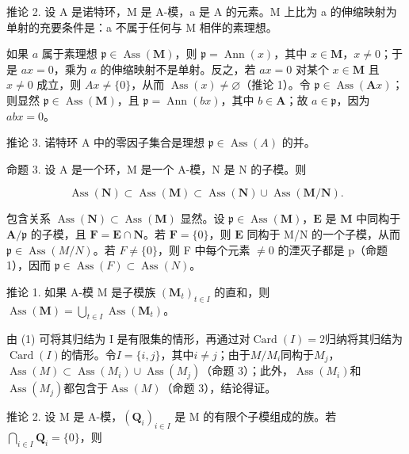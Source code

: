 推论 2. 设 A 是诺特环，M 是 A-模，a 是 A 的元素。M 上比为 a 的伸缩映射为单射的充要条件是：a 不属于任何与 M 相伴的素理想。

如果 \(a\) 属于素理想 \(\mathfrak{p} \in \operatorname{Ass}(\mathbf{M})\)，则 \(\mathfrak{p} = \operatorname{Ann}(x)\)，其中 \(x \in \mathbf{M}\)，\(x \neq 0\)；于是 \(ax = 0\)，乘为 \(a\) 的伸缩映射不是单射。反之，若 \(ax = 0\) 对某个 \(x \in \mathbf{M}\) 且 \(x \neq 0\) 成立，则 \(Ax \neq \{0\}\)，从而 \(\operatorname{Ass}(x) \neq \varnothing\)（推论 1）。令 \(\mathfrak{p} \in \operatorname{Ass}(\mathbf{A}x)\)；则显然 \(\mathfrak{p} \in \operatorname{Ass}(\mathbf{M})\)，且 \(\mathfrak{p} = \operatorname{Ann}(bx)\)，其中 \(b \in \mathbf{A}\)；故 \(a \in \mathfrak{p}\)，因为 \(abx = 0\)。

推论 3. 诺特环 A 中的零因子集合是理想 \(\mathfrak{p} \in \operatorname{Ass}(A)\) 的并。

命题 3. 设 A 是一个环，M 是一个 A-模，N 是 N 的子模。则

\[
\operatorname{Ass} (\mathbf {N}) \subset \operatorname{Ass} (\mathbf {M}) \subset \operatorname{Ass} (\mathbf {N}) \cup \operatorname{Ass} (\mathbf {M} / \mathbf {N}).\tag{2}
\]

包含关系 \(\operatorname{Ass}(\mathbf{N}) \subset \operatorname{Ass}(\mathbf{M})\) 显然。设 \(\mathfrak{p} \in \operatorname{Ass}(\mathbf{M})\)，\(\mathbf{E}\) 是 \(\mathbf{M}\) 中同构于 \(\mathbf{A} / \mathfrak{p}\) 的子模，且 \(\mathbf{F} = \mathbf{E} \cap \mathbf{N}\)。若 \(\mathbf{F} = \{0\}\)，则 \(\mathbf{E}\) 同构于 M/N 的一个子模，从而 \(\mathfrak{p} \in \operatorname{Ass}(M/N)\)。若 \(F \neq \{0\}\)，则 F 中每个元素 \(\neq 0\) 的湮灭子都是 p（命题 1），因而 \(\mathfrak{p} \in \operatorname{Ass}(F) \subset \operatorname{Ass}(N)\)。

推论 1. 如果 A-模 M 是子模族 \((\mathbf{M}_t)_{t \in I}\) 的直和，则 \(\operatorname{Ass}(\mathbf{M}) = \bigcup_{t \in I} \operatorname{Ass}(\mathbf{M}_t)\)。

由 (1) 可将其归结为 I 是有限集的情形，再通过对\(\operatorname{Card}(I) = 2\)归纳将其归结为\(\operatorname{Card}(I)\)的情形。令\(I = \{i, j\}\)，其中\(i \neq j\)；由于\(M/M_{i}\)同构于\(M_{j}\)，\(\operatorname{Ass}(M) \subset \operatorname{Ass}(M_{i}) \cup \operatorname{Ass}(M_{j})\)（命题 3）；此外，\(\operatorname{Ass}(M_{i})\)和\(\operatorname{Ass}(M_{j})\)都包含于\(\operatorname{Ass}(M)\)（命题 3），结论得证。

推论 2. 设 M 是 A-模，\((\mathbf{Q}_i)_{i\in I}\) 是 M 的有限个子模组成的族。若 \(\bigcap_{i\in I} \mathbf{Q}_i = \{0\}\)，则

